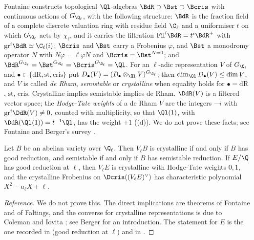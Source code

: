 \begin{definition}\label{def:blochkato:period-rings}
Fontaine constructs topological $\Ql$-algebras $\BdR\supset\Bst\supset\Bcris$ with continuous actions of $G_{\Q_\ell}$, with the following structure:
$\BdR$ is the fraction field of a complete discrete valuation ring with residue field $\C_\ell$ and a uniformiser $t$ on which $G_{\Q_\ell}$ acts by $\chi_\ell$, and it
carries the filtration $\mathrm{Fil}^i\BdR=t^i\BdR^+$ with $\mathrm{gr}^i\BdR\simeq\C_\ell(i)$; $\Bcris$ and $\Bst$ carry a Frobenius $\varphi$, and $\Bst$ a monodromy operator
$N$ with $N\varphi=\ell\varphi N$ and $\Bcris=\Bst^{N=0}$; and $\BdR^{G_{\Q_\ell}}=\Bst^{G_{\Q_\ell}}=\Bcris^{G_{\Q_\ell}}=\Ql$. For an $\ell$-adic representation $V$ of $G_{\Q_\ell}$ and
$\bullet\in\{\mathrm{dR},\mathrm{st},\mathrm{cris}\}$ put $D_\bullet(V)=(B_\bullet\otimes_{\Ql}V)^{G_{\Q_\ell}}$; then $\dim_{\Ql}D_\bullet(V)\le\dim V$, and $V$ is called \emph{de Rham},
\emph{semistable} or \emph{crystalline} when equality holds for $\bullet=\mathrm{dR}$, $\mathrm{st}$, $\mathrm{cris}$. Crystalline implies semistable implies de Rham. $\DdR(V)$ is a
filtered vector space; the \emph{Hodge-Tate weights} of a de Rham $V$ are the integers $-i$ with $\mathrm{gr}^i\DdR(V)\ne0$, counted with multiplicity, so that
$\Ql(1)$, with $\DdR(\Ql(1))=t^{-1}\Ql$, has the weight $+1$ ((d)). We do not prove these facts; see Fontaine \cite{Fontaine} and
Berger's survey \cite{Berger}.
\end{definition}

\begin{theorem}\label{thm:blochkato:crystalline-good-reduction}
Let $B$ be an abelian variety over $\Q_\ell$. Then $V_\ell B$ is crystalline if and only if $B$ has good reduction, and semistable if and only if $B$ has
semistable reduction. If $E/\Q$ has good reduction at $\ell$, then $V_\ell E$ is crystalline with Hodge-Tate weights $0,1$, and the crystalline Frobenius on
$\Dcris((V_\ell E)^\vee)$ has characteristic polynomial $X^2-a_\ell X+\ell$.
\end{theorem}

\begin{proof}[Reference]
We do not prove this. The direct implications are theorems of Fontaine and of Faltings, and the converse for crystalline representations is due to
Coleman and Iovita \cite{ColemanIovita99}; see Berger \cite{Berger} for an introduction. The statement for $E$ is the one recorded in 
(good reduction at $\ell$) and in .
\end{proof}

